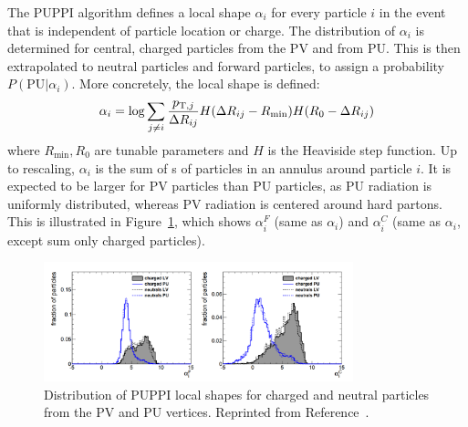 The PUPPI algorithm defines a local shape $\alpha_i$ for every particle $i$ in the event that is independent of particle location or charge.
The distribution of $\alpha_i$ is determined for central, charged particles from the PV and from PU.
This is then extrapolated to neutral particles and forward particles, to assign a probability $P(\mathrm{PU}|\alpha_i)$. 
More concretely, the local shape is defined:
\begin{equation}
    \alpha_i = \log \sum_{j \neq i} \frac{p_{\mathrm{T},j}}{\Delta R_{ij}} H(\Delta R_{ij} - R_{\min})H(R_0 - \Delta R_{ij})
\end{equation}
where $R_{\min}, R_0$ are tunable parameters and $H$ is the Heaviside step function. 
Up to rescaling, $\alpha_i$ is the sum of \pt s of particles in an annulus around particle $i$. 
It is expected to be larger for PV particles than PU particles, as PU radiation is uniformly distributed, whereas PV radiation is centered around hard partons.
This is illustrated in Figure~\ref{fig:cms:puppi}, which shows $\alpha_i^F$ (same as $\alpha_i$) and $\alpha_i^C$ (same as $\alpha_i$, except sum only charged particles).

\begin{figure}[]
\begin{center}
    \includegraphics[width=0.8\textwidth]{figures/cms/puppi.png}
    \caption{Distribution of PUPPI local shapes for charged and neutral particles from the PV and PU vertices.
             Reprinted from Reference~\cite{puppi}.}
    \label{fig:cms:puppi}
\end{center}
\end{figure}

